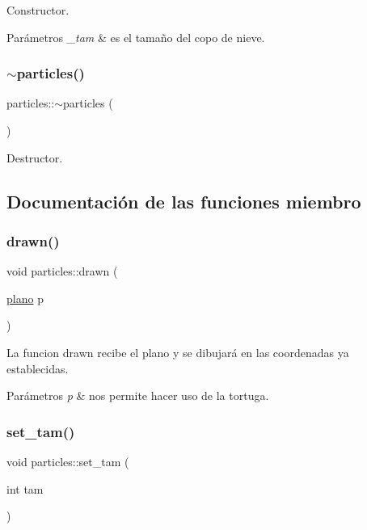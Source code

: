 Constructor. 
\begin{DoxyParams}{Parámetros}
{\em \+\_\+tam} & es el tamaño del copo de nieve. \\
\hline
\end{DoxyParams}
\mbox{\label{classparticles_a595906f264178672e1f8fb3a047e056d}} 
\subsubsection{\texorpdfstring{$\sim$particles()}{~particles()}}
{\footnotesize\ttfamily particles\+::$\sim$particles (\begin{DoxyParamCaption}{ }\end{DoxyParamCaption})}

Destructor. 

\subsection{Documentación de las funciones miembro}
\mbox{\label{classparticles_a854301db81fec822416fa2a54a1b09d7}} 
\subsubsection{\texorpdfstring{drawn()}{drawn()}}
{\footnotesize\ttfamily void particles\+::drawn (\begin{DoxyParamCaption}\item[{\hyperlink{classplano}{plano}}]{p }\end{DoxyParamCaption})}

La funcion drawn recibe el plano y se dibujará en las coordenadas ya establecidas. 
\begin{DoxyParams}{Parámetros}
{\em p} & nos permite hacer uso de la tortuga. \\
\hline
\end{DoxyParams}
\mbox{\label{classparticles_a4ef23182e87e18e3cec15280478210d8}} 
\subsubsection{\texorpdfstring{set\+\_\+tam()}{set\_tam()}}
{\footnotesize\ttfamily void particles\+::set\+\_\+tam (\begin{DoxyParamCaption}\item[{int}]{tam }\end{DoxyParamCaption})}

